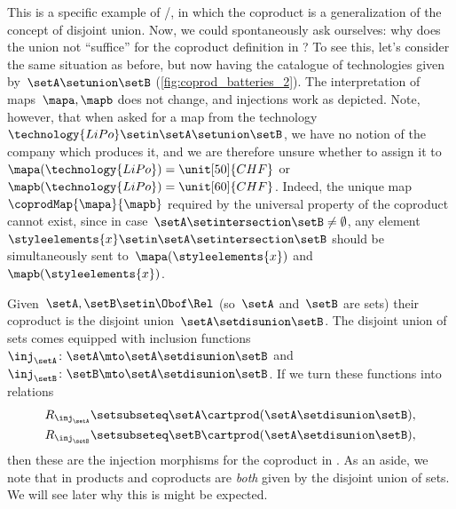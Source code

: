 \begin{example}
    This is a specific example of \Set/\FinSet, in which the coproduct is a generalization of the concept of disjoint union.
    Now, we could spontaneously ask ourselves: why does the union not ``suffice'' for the coproduct definition in \Set?
    To see this, let's consider the same situation as before, but now having the catalogue of technologies given by~$\setA\setunion \setB$ (\cref{fig:coprod_batteries_2}).
    The interpretation of maps~$\mapa,\mapb$ does not change, and injections work as depicted.
    Note, however, that when asked for a map from the technology~$\technology{LiPo}\setin \setA\setunion \setB$, we have no notion of the company which produces it, and we are therefore unsure whether to assign it to~$\mapa(\technology{LiPo})=\unit[50]{CHF}$ or~$\mapb(\technology{LiPo})=\unit[60]{CHF}$.
    Indeed, the unique map~$\coprodMap{\mapa}{\mapb}$ required by the universal property of the coproduct cannot exist, since in case~$\setA\setintersection \setB\neq \emptyset$, any element~$\styleelements{x}\setin \setA\setintersection \setB$ should be simultaneously sent to~$\mapa(\styleelements{x})$ and~$\mapb(\styleelements{x})$.
\end{example}


\begin{example}
    Given~$\setA,\setB\setin \Obof\Rel$ (so~$\setA$ and~$\setB$ are sets) their coproduct is the disjoint union~$\setA \setdisunion \setB$.
    The disjoint union of sets comes equipped with inclusion functions~$\inj_\setA\colon \setA\mto \setA \setdisunion\setB$ and~$\inj_\setB\colon \setB\mto \setA \setdisunion\setB$.
    If we turn these functions into relations
    \begin{equation*}
        \begin{aligned}
            R_{\inj_\setA} & \setsubseteq \setA\cartprod (\setA \setdisunion\setB), \\
            R_{\inj_\setB} & \setsubseteq \setB\cartprod (\setA \setdisunion\setB),
        \end{aligned}
    \end{equation*}
    then these are the injection morphisms for the coproduct in \Rel.
    As an aside, we note that in \Rel products and coproducts are \emph{both} given by the disjoint union of sets.
    We will see later why this is might be expected.
\end{example}

